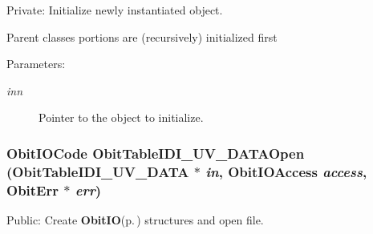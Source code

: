 Private: Initialize newly instantiated object. 

Parent classes portions are (recursively) initialized first \begin{Desc}
\item[Parameters:]
\begin{description}
\item[{\em inn}]Pointer to the object to initialize. \end{description}
\end{Desc}
\subsubsection{\setlength{\rightskip}{0pt plus 5cm}Obit\-IOCode Obit\-Table\-IDI\_\-UV\_\-DATAOpen ({\bf Obit\-Table\-IDI\_\-UV\_\-DATA} $\ast$ {\em in}, Obit\-IOAccess {\em access}, {\bf Obit\-Err} $\ast$ {\em err})}\label{ObitTableIDI__UV__DATA_8c_a21}


Public: Create {\bf Obit\-IO}{\rm (p.\,\pageref{structObitIO})} structures and open file. 

